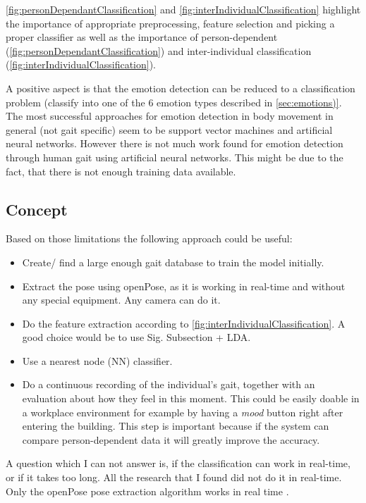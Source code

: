 \documentclass[conference]{IEEEtran}
\begin{document}
\autoref{fig:personDependantClassification} and \autoref{fig:interIndividualClassification} highlight the importance of appropriate preprocessing, feature selection and picking a proper classifier as well as the importance of person-dependent (\autoref{fig:personDependantClassification}) and inter-individual classification (\autoref{fig:interIndividualClassification}).\

A positive aspect is that the emotion detection can be reduced to a classification problem (classify into one of the 6 emotion types\cite{eckman2003emotions} described in \autoref{sec:emotions)}. The most successful approaches for emotion detection in body movement in general (not gait specific) seem to be support vector machines\cite{karg2012pattern,schindler2008recognizing} and artificial neural networks\cite{karg2012pattern, kapur2005gesture}. However there is not much work found for emotion detection through human gait using artificial neural networks\cite{janssen2008recognition}. This might be due to the fact, that there is not enough training data available.

\subsection{Concept}
\label{subsec:proposedModel}
Based on those limitations the following approach could be useful:
\begin{itemize}
\item{Create/ find a large enough gait database to train the model initially.}
\item{Extract the pose using openPose\cite{cao2017realtime}, as it is working in real-time and without any special equipment. Any camera can do it.}
\item{Do the feature extraction according to \autoref{fig:interIndividualClassification}. A good choice would be to use Sig. Subsection + LDA\cite{karg2012pattern}.}
\item{Use a nearest node (NN) classifier\cite{karg2012pattern}.}
\item{Do a continuous recording of the individual's gait, together with an evaluation about how they feel in this moment. This could be easily doable in a workplace environment for example by having a \emph{mood} button right after entering the building. This step is important because if the system can compare person-dependent data it will greatly improve the accuracy.}
\end{itemize}

A question which I can not answer is, if the classification can work in real-time, or if it takes too long. All the research that I found did not do it in real-time. Only the openPose pose extraction algorithm works in real time \cite{cao2017realtime}.\
\end{document}
